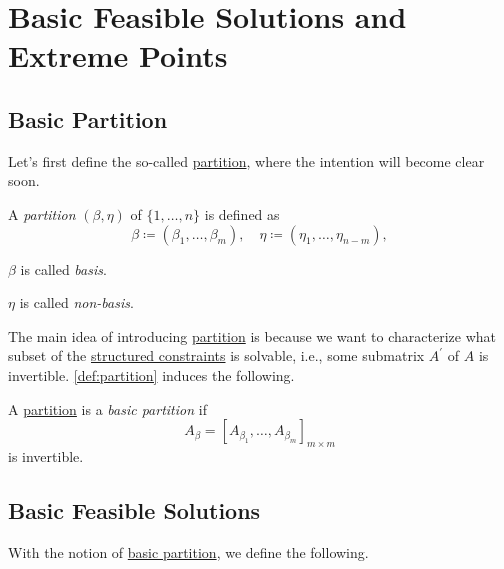 \section{Basic Feasible Solutions and Extreme Points}

\subsection{Basic Partition}
Let's first define the so-called \hyperref[def:partition]{partition}, where the intention will become clear soon.

\begin{definition}[Partition]\label{def:partition}
	A \emph{partition} \((\beta , \eta )\) of \(\{1, \dots , n\}\) is defined as
	\[
		\beta \coloneqq (\beta_1, \dots , \beta_m),\quad \eta \coloneqq (\eta_1, \dots , \eta_{n-m}),
	\]

	\begin{definition}[Basis]\label{def:basis}
		\(\beta\) is called \emph{basis}.
	\end{definition}
	\begin{definition}\label{def:non-basis}
		\(\eta\) is called \emph{non-basis}.
	\end{definition}
\end{definition}

The main idea of introducing \hyperref[def:partition]{partition} is because we want to characterize what subset of the \hyperref[def:structured-constraint]{structured constraints} is solvable, i.e., some submatrix \(A^\prime \) of \(A\) is invertible. \autoref{def:partition} induces the following.

\begin{definition}\label{def:basic-partition}
	A \hyperref[def:partition]{partition} is a \emph{basic partition} if
	\[
		A_{\beta} = \left[ A_{\beta_1}, \dots , A_{\beta_m} \right]_{m\times m}
	\]
	is invertible.
\end{definition}

\subsection{Basic Feasible Solutions}
With the notion of \hyperref[def:basic-partition]{basic partition}, we define the following.

